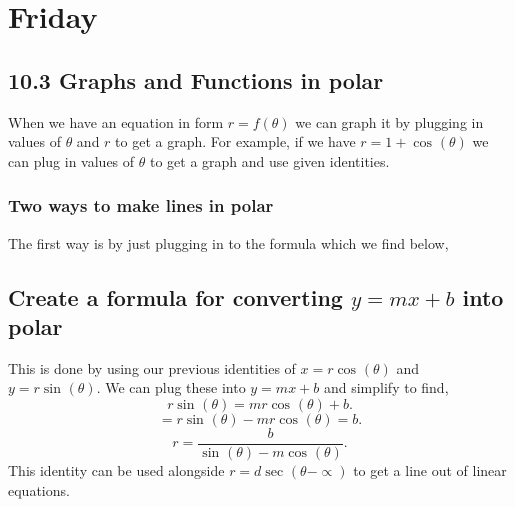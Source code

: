 \section{Friday}%
\label{sec:Friday}
\subsection{10.3 Graphs and Functions in polar}%
\label{sub:10.3 Graphs and Functions in polar}
When we have an equation in form $ r=f\left( \theta \right)  $ we can graph it by plugging in values of $ \theta $ and $ r $ to get a graph. For example, if we have $ r=1+\cos^{  } \left( \theta \right)  $ we can plug in values of $ \theta $ to get a graph and use given identities. 

\subsubsection{Two ways to make lines in polar}
The first way is by just plugging in to the formula which we find below,

\subsection{Create a formula for converting $ y=mx+b $ into polar}%
This is done by using our previous identities of $ x=r\cos^{  } \left( \theta \right)  $ and $ y=r\sin^{  } \left( \theta \right)  $. We can plug these into $ y=mx+b $ and simplify to find,
\[
r\sin^{  } \left( \theta \right) =mr\cos^{  } \left( \theta \right) +b
.\] 
\[
=r\sin^{  } \left( \theta \right) -mr\cos^{  } \left( \theta \right) =b
.\] 
\[
r=\frac{ b }{ \sin^{  } \left( \theta \right) - m\cos^{  } \left( \theta \right)  } 
.\] 
This identity can be used alongside $ r=d\sec^{  } \left( \theta - \propto \right)  $ to get a line out of linear equations. 
